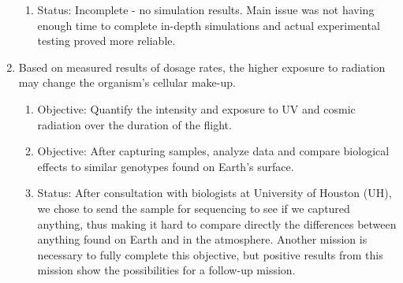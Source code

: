 \begin{enumerate}
\begin{enumerate}
	\item Status: Incomplete - no simulation results.  Main issue was not having enough time to complete in-depth simulations and actual experimental testing proved more reliable.
	\end{enumerate}
\item Based on measured results of dosage rates, the higher exposure to radiation may change the organism's cellular make-up.
	\begin{enumerate}
	\item Objective: Quantify the intensity and exposure to UV and cosmic radiation over the duration of the flight.
	\item Objective: After capturing samples, analyze data and compare biological effects to similar genotypes found on Earth's surface.
	\item Status: After consultation with biologists at University of Houston (UH), we chose to send the sample for sequencing to see if we captured anything, thus making it hard to compare directly the differences between anything found on Earth and in the atmosphere.  Another mission is necessary to fully complete this objective, but positive results from this mission show the possibilities for a follow-up mission.
	\end{enumerate}
\end{enumerate}

